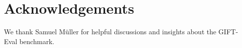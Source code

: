 \documentclass{article}
\begin{document}





\clearpage

\section*{Acknowledgements}
We thank Samuel Müller for helpful discussions and insights about the GIFT-Eval benchmark.

\end{document}
